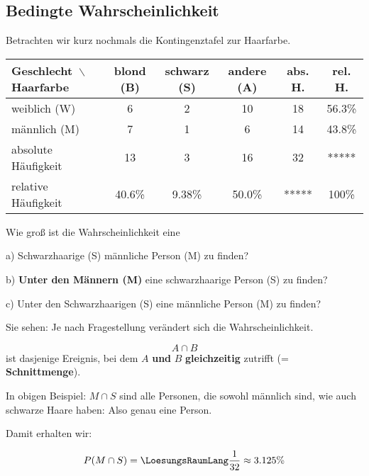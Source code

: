 
\subsection{Bedingte Wahrscheinlichkeit}

Betrachten wir kurz nochmals die Kontingenztafel zur Haarfarbe.

\begin{tabular}{l|c|c|c|c|c}
Geschlecht\, $\backslash$ Haarfarbe  &  blond (B)  & schwarz (S)   & andere  (A) & abs. H.    & rel. H. \\ \hline
weiblich (W)                         &  6       & 2       & 10          &       18         & 56.3\%\\ \hline 
männlich (M)                         &  7       & 1       &  6          &       14 & 43.8\%\\ \hline
absolute Häufigkeit                  & 13       & 3       & 16          &       32 &  *****          \\ \hline
relative Häufigkeit                  & 40.6\%   & 9.38\%  & 50.0\%      &   *****  &  100\%          \\ \hline
\end{tabular}

Wie groß ist die Wahrscheinlichkeit eine

a) Schwarzhaarige (S) männliche Person (M) zu finden? 

b) \textbf{Unter den Männern (M)} eine schwarzhaarige Person (S) zu finden? 

c) Unter den Schwarzhaarigen (S) eine männliche Person (M) zu finden? 

Sie sehen: Je nach Fragestellung verändert sich die Wahrscheinlichkeit.


\begin{definition}{}{}
$$A\cap B$$ ist dasjenige Ereignis, bei dem $A$ \textbf{und} $B$
\textbf{gleichzeitig} zutrifft (= \textbf{Schnittmenge}).
\end{definition}

In obigen Beispiel: $M \cap S$ sind alle Personen, die sowohl
männlich sind, wie auch schwarze Haare haben: Also genau eine Person.

Damit erhalten wir:

$$P(M\cap S) = \LoesungsRaumLang{\frac{1}{32} \approx 3.125\%}$$


